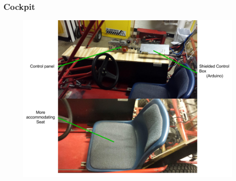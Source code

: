 \documentclass{beamer}
\begin{document}
\begin{frame}
	\frametitle{Cockpit}
	\begin{figure}
		\centering 
		\includegraphics[scale=.27]{figures/png/SeniorDesignPresentation-7.png} 
	\end{figure}	
\end{frame}
\end{document}
